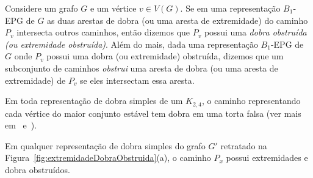 



\begin{definition}
Considere um grafo $G$ e um vértice $v \in V(G)$. Se em uma representação $B_1$-EPG de $G$ as duas arestas de dobra (ou uma aresta de extremidade) do caminho $P_v$ intersecta outros caminhos, então dizemos que  $P_v$ possui uma \emph{dobra obstruída (ou extremidade obstruída)}. 
Além do mais, dada uma representação $B_1$-EPG de $G$ onde $P_v$ possui uma dobra (ou extremidade) obstruída, dizemos que um subconjunto de caminhos \emph{obstrui} uma aresta de dobra (ou uma aresta de extremidade) de  $P_v$ se eles intersectam essa aresta. 
\end{definition}


\begin{fac} \label{fact:k24facts}
Em toda representação de dobra simples de um $K_{2,4}$, o caminho representando cada vértice do maior conjunto estável tem dobra em uma  torta falsa (ver mais em~\cite{Asinowski2009} e~\cite{daniel2014b}).
\end{fac}


\begin{lema}\label{lem:obstrucao}
Em qualquer representação de dobra simples do grafo  $G'$ retratado na  Figura~\ref{fig:extremidadeDobraObstruida}(a), o caminho $P_x$ possui extremidades e dobra obstruídos.
\end{lema}

